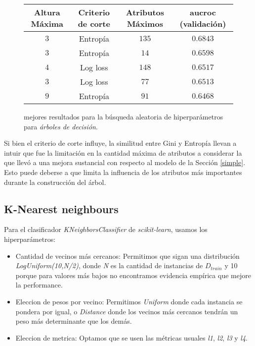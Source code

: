 \vspace{0.5em}
\begin{figure}[!htbp]
    \begin{center}
        \begin{tabular}{ |c|c|c|c| } 
         \hline
        Altura Máxima   & Criterio de corte & Atributos Máximos  & aucroc (validación) \\
        \hline
        $3$             & Entropía          &  $135$            & $0.6843$  \\ 
        $3$             & Entropía          &  $14$             & $0.6598$  \\
        $4$             & Log loss          &  $148$            & $0.6517$  \\ 
        $3$             & Log loss          &  $77$             & $0.6513$  \\
        $9$             & Entropía          &  $91$             & $0.6468$  \\ 
        \hline
        \end{tabular}
    \end{center}
    \caption{mejores resultados para la búsqueda aleatoria de hiperparámetros para \textit{árboles de decisión}.} \label{random_tree}
\end{figure}

Si bien el criterio de corte influye, la similitud entre Gini y Entropía llevan a intuir que fue la limitación en la cantidad máxima de atributos a considerar la que llevó a una mejora sustancial con respecto al modelo de la Sección \ref{simple}. Esto puede deberse a que limita la influencia de los atributos más importantes durante la construcción del árbol.

\subsection{K-Nearest neighbours}
Para el clasificador \textit{KNeighborsClassifier} de \textit{scikit-learn}, usamos los hiperparámetros:

\begin{itemize}
    \item Cantidad de vecinos más cercanos: Permitimos que sigan una distribución \textit{LogUniform(10,N/2)}, donde \textit{N} es la cantidad de instancias de $D_{train}$ y 10 porque para valores más bajos no encontramos evidencia empírica que mejore la performance. 
    \item Eleccion de pesos por vecino: Permitimos \textit{Uniform} donde cada instancia se pondera por igual, o \textit{Distance} donde los vecinos más cercanos tendrán un peso más determinante que los demás.
    \item Eleccion de metrica: Optamos que se usen las métricas usuales \textit{l1}, \textit{l2}, \textit{l3} y \textit{l4}. 
\end{itemize}

